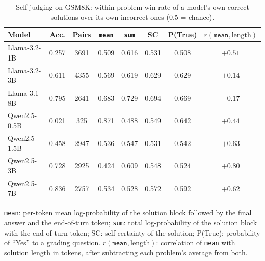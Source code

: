 \begin{table}[H]
\centering
\caption{Self-judging on GSM8K: within-problem win rate of a model's own correct solutions over its own incorrect ones (0.5 = chance).}
\label{tab:disc-gsm8k}
\begin{threeparttable}
\begin{tabular}{lccccccc}
\toprule
Model & Acc. & Pairs & \texttt{mean} & \texttt{sum} & SC & P(True) & $r(\texttt{mean}, \text{length})$ \\
\midrule
Llama-3.2-1B  & 0.257 & 3691 & 0.509 & 0.616 & 0.531 & 0.508 & $+0.51$ \\
Llama-3.2-3B  & 0.611 & 4355 & 0.569 & 0.619 & 0.629 & 0.629 & $+0.14$ \\
Llama-3.1-8B  & 0.795 & 2641 & 0.683 & 0.729 & 0.694 & 0.669 & $-0.17$ \\
Qwen2.5-0.5B  & 0.021 & 325  & 0.871 & 0.488 & 0.549 & 0.642 & $+0.44$ \\
Qwen2.5-1.5B  & 0.458 & 2947 & 0.536 & 0.547 & 0.531 & 0.542 & $+0.63$ \\
Qwen2.5-3B    & 0.728 & 2925 & 0.424 & 0.609 & 0.548 & 0.524 & $+0.80$ \\
Qwen2.5-7B    & 0.836 & 2757 & 0.534 & 0.528 & 0.572 & 0.592 & $+0.62$ \\
\bottomrule
\end{tabular}
\begin{tablenotes}\footnotesize
\item \texttt{mean}: per-token mean log-probability of the solution block followed by the final answer and the end-of-turn token; \texttt{sum}: total log-probability of the solution block with the end-of-turn token; SC: self-certainty of the solution; P(True): probability of ``Yes'' to a grading question. $r(\texttt{mean}, \text{length})$: correlation of \texttt{mean} with solution length in tokens, after subtracting each problem's average from both.
\end{tablenotes}
\end{threeparttable}
\end{table}
